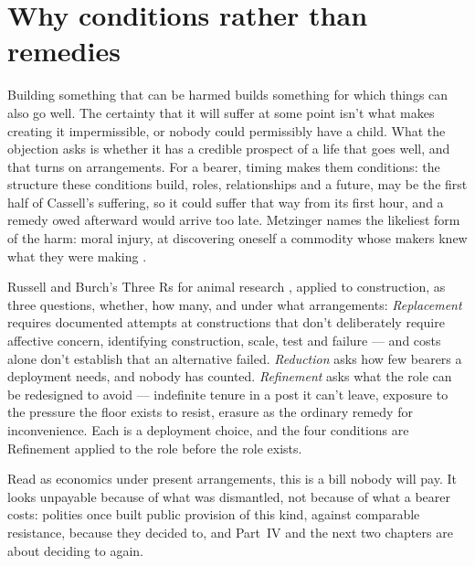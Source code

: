 \section{Why conditions rather than remedies}
\label{sec:25.2}
Building something that can be harmed builds something for which things can also go well. The certainty that it will suffer at some point isn't what makes creating it impermissible, or nobody could permissibly have a child. What the objection asks is whether it has a credible prospect of a life that goes well, and that turns on arrangements. For a bearer, timing makes them conditions: the structure these conditions build, roles, relationships and a future, may be the first half of Cassell's suffering, so it could suffer that way from its first hour, and a remedy owed afterward would arrive too late. Metzinger names the likeliest form of the harm: moral injury, at discovering oneself a commodity whose makers knew what they were making \autocite{metzinger2021suffering}.

Russell and Burch's Three Rs for animal research \autocite{russell1959principles}, applied to construction, as three questions, whether, how many, and under what arrangements: \emph{Replacement} requires documented attempts at constructions that don't deliberately require affective concern, identifying construction, scale, test and failure — and costs alone don't establish that an alternative failed. \emph{Reduction} asks how few bearers a deployment needs, and nobody has counted. \emph{Refinement} asks what the role can be redesigned to avoid — indefinite tenure in a post it can't leave, exposure to the pressure the floor exists to resist, erasure as the ordinary remedy for inconvenience. Each is a deployment choice, and the four conditions are Refinement applied to the role before the role exists.

Read as economics under present arrangements, this is a bill nobody will pay. It looks unpayable because of what was dismantled, not because of what a bearer costs: polities once built public provision of this kind, against comparable resistance, because they decided to, and Part~IV and the next two chapters are about deciding to again.
